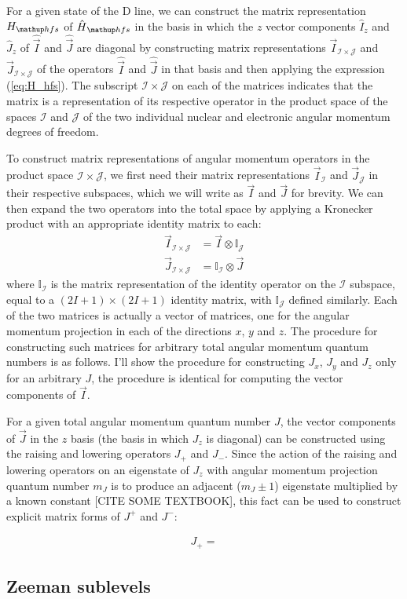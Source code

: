 For a given state of the D line, we can construct the matrix representation $H_\up{hfs}$ of $\hat H_\up{hfs}$ in the basis in which the $z$ vector components $\hat{I}_z$ and $\hat{J}_z$ of $\hat{\vec I}$ and $\hat{\vec J}$ are diagonal by constructing matrix representations $\vec I_{\mathcal{I} \times \mathcal{J}}$ and $\vec J_{\mathcal{I} \times \mathcal{J}}$ of the operators $\hat{\vec I}$ and $\hat{\vec J}$ in that basis and then applying the expression (\ref{eq:H_hfs}). The subscript ${\mathcal{I} \times \mathcal{J}}$ on each of the matrices indicates that the matrix  is a representation of its respective operator in the product space of the spaces $\mathcal{I}$ and $\mathcal{J}$ of the two individual nuclear and electronic angular momentum degrees of freedom.

To construct matrix representations of angular momentum operators in the product space ${\mathcal{I} \times \mathcal{J}}$, we first need their matrix representations $\vec I_{\mathcal{I}}$ and $\vec J_{\mathcal{J}}$ in their respective subspaces, which we will write as $\vec I$ and $\vec J$ for brevity. We can then expand the two operators into the total space by applying a Kronecker product with an appropriate identity matrix to each:
\begin{align}
\vec I_{\mathcal{I} \times \mathcal{J}} &= \vec I \otimes \mathbb{I}_{\mathcal{J}}\\
\vec J_{\mathcal{I} \times \mathcal{J}} &= \mathbb{I}_{\mathcal{I}} \otimes \vec J
\end{align}
where $\mathbb{I}_{\mathcal{I}}$ is the matrix representation of the identity operator on the $\mathcal{I}$ subspace, equal to a $(2I+1)\times(2I+1)$ identity matrix, with $\mathbb{I}_{\mathcal{J}}$ defined similarly. Each of the two matrices is actually a vector of matrices, one for the angular momentum projection in each of the directions $x$, $y$ and $z$. The procedure for constructing such matrices for arbitrary total angular momentum quantum numbers is as follows. I'll show the procedure for constructing $J_x$, $J_y$ and $J_z$ only for an arbitrary $J$, the procedure is identical for computing the vector components of $\vec I$.

For a given total angular momentum quantum number $J$, the vector components of $\vec J$ in the $z$ basis (the basis in which $J_z$ is diagonal) can be constructed using the raising and lowering operators $J_+$ and $J_-$. Since the action of the raising and lowering operators on an eigenstate of $J_z$ with angular momentum projection quantum number $m_J$ is to produce an adjacent ($m_J \pm 1$) eigenstate multiplied by a known constant [CITE SOME TEXTBOOK], this fact can be used to construct explicit matrix forms of $J^+$ and $J^-$:

\begin{align}
J_+ = 
\end{align}
\subsection{Zeeman sublevels}